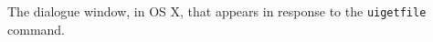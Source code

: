 \label{fig:uigetfile} The dialogue window, in OS X, that appears in response to the \lstinline{uigetfile} command.